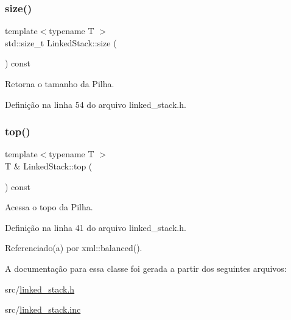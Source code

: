 \subsubsection{\texorpdfstring{size()}{size()}}
{\footnotesize\ttfamily template$<$typename T $>$ \\
std\+::size\+\_\+t Linked\+Stack\+::size (\begin{DoxyParamCaption}{ }\end{DoxyParamCaption}) const}



Retorna o tamanho da Pilha. 



Definição na linha 54 do arquivo linked\+\_\+stack.\+h.

\mbox{\label{classstructures_1_1_linked_stack_ac1405eff07488586dced5275b97e562f}} 
\subsubsection{\texorpdfstring{top()}{top()}}
{\footnotesize\ttfamily template$<$typename T $>$ \\
T \& Linked\+Stack\+::top (\begin{DoxyParamCaption}{ }\end{DoxyParamCaption}) const}



Acessa o topo da Pilha. 



Definição na linha 41 do arquivo linked\+\_\+stack.\+h.



Referenciado(a) por xml\+::balanced().



A documentação para essa classe foi gerada a partir dos seguintes arquivos\+:\begin{DoxyCompactItemize}
\item 
src/\mbox{\hyperlink{linked__stack_8h}{linked\+\_\+stack.\+h}}\item 
src/\mbox{\hyperlink{linked__stack_8inc}{linked\+\_\+stack.\+inc}}\end{DoxyCompactItemize}
